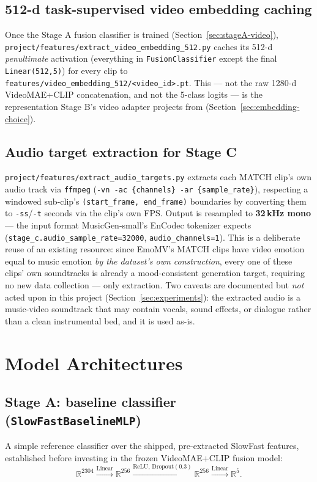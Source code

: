 \documentclass[11pt]{article}
\begin{document}
\subsection{512-d task-supervised video embedding caching}
Once the Stage A fusion classifier is trained (Section~\ref{sec:stageA-video}),
\texttt{project/features/extract\_video\_embedding\_512.py} caches its 512-d \emph{penultimate}
activation (everything in \texttt{FusionClassifier} except the final \texttt{Linear(512,5)}) for
every clip to \texttt{features/video\_embedding\_512/<video\_id>.pt}. This --- not the raw
1280-d VideoMAE+CLIP concatenation, and not the 5-class logits --- is the representation Stage B's
video adapter projects from (Section~\ref{sec:embedding-choice}).

\subsection{Audio target extraction for Stage C}
\texttt{project/features/extract\_audio\_targets.py} extracts each MATCH clip's own audio track
via \texttt{ffmpeg} (\texttt{-vn -ac \{channels\} -ar \{sample\_rate\}}), respecting a windowed
sub-clip's \texttt{(start\_frame, end\_frame)} boundaries by converting them to \texttt{-ss}/\texttt{-t}
seconds via the clip's own FPS. Output is resampled to \textbf{32\,kHz mono} --- the input format
MusicGen-small's EnCodec tokenizer expects (\texttt{stage\_c.audio\_sample\_rate=32000},
\texttt{audio\_channels=1}). This is a deliberate reuse of an existing resource: since EmoMV's
MATCH clips have video emotion equal to music emotion \emph{by the dataset's own construction},
every one of these clips' own soundtracks is already a mood-consistent generation target, requiring
no new data collection --- only extraction. Two caveats are documented but \emph{not} acted upon in
this project (Section~\ref{sec:experiments}): the extracted audio is a music-video soundtrack that
may contain vocals, sound effects, or dialogue rather than a clean instrumental bed, and it is used
as-is.

\section{Model Architectures}
\label{sec:models}

\subsection{Stage A: baseline classifier (\texttt{SlowFastBaselineMLP})}
A simple reference classifier over the shipped, pre-extracted SlowFast features, established
before investing in the frozen VideoMAE+CLIP fusion model:
\[
\mathbb{R}^{2304} \xrightarrow{\text{Linear}} \mathbb{R}^{256} \xrightarrow{\text{ReLU, Dropout}(0.3)} \mathbb{R}^{256} \xrightarrow{\text{Linear}} \mathbb{R}^{5}.
\]
\end{document}
